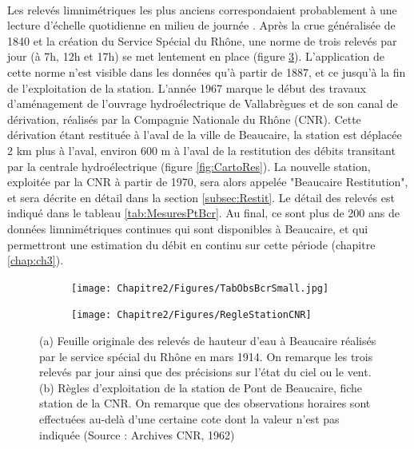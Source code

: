 	\paragraph{} Les relevés limnimétriques les plus anciens correspondaient probablement à une lecture d'échelle quotidienne en milieu de journée \citep{pichard_hauteurs_2013}. Après la crue généralisée de 1840 et la création du Service Spécial du Rhône, une norme de trois relevés par jour (à 7h, 12h et 17h) se met lentement en place (figure \ref{fig:RelevesPt}). L'application de cette norme n'est visible dans les données qu'à partir de 1887, et ce jusqu'à la fin de l'exploitation de la station.  L'année 1967 marque le début des travaux d'aménagement de l'ouvrage hydroélectrique de Vallabrègues et de son canal de dérivation, réalisés par la Compagnie Nationale du Rhône (CNR). Cette dérivation étant restituée à l'aval de la ville de Beaucaire, la station est déplacée 2 km plus à l'aval, environ 600 m à l'aval de la restitution des débits transitant par la centrale hydroélectrique (figure \ref{fig:CartoRes}). La nouvelle station, exploitée par la CNR à partir de 1970, sera alors appelée "Beaucaire Restitution", et sera décrite en détail dans la section \ref{subsec:Restit}. Le détail des relevés est indiqué dans le tableau \ref{tab:MesuresPtBcr}. Au final, ce sont plus de 200 ans de données limnimétriques continues qui sont disponibles à Beaucaire, et qui permettront une estimation du débit en continu sur cette période (chapitre \ref{chap:ch3}). 
	
	\begin{figure}[h]
          \centering
            \begin{subfigure}{0.49\linewidth}
            \centering
            	\texttt{[image: Chapitre2/Figures/TabObsBcrSmall.jpg]}\hfill
            	\caption{}
            	\label{subfig:TabObsPt}
            \end{subfigure}
            \begin{subfigure}{0.49\linewidth}
            \centering
            	\texttt{[image: Chapitre2/Figures/RegleStationCNR]}
            	\caption{}
           		\label{subfig:RegleCNR}
            \end{subfigure}
      \caption{(a) Feuille originale des relevés de hauteur d'eau à Beaucaire réalisés par le service spécial du Rhône en mars 1914. On remarque les trois relevés par jour ainsi que des précisions sur l'état du ciel ou le vent. (b) Règles d'exploitation de la station de Pont de Beaucaire, fiche station de la CNR. On remarque que des observations horaires sont effectuées au-delà d'une certaine cote dont la valeur n'est pas indiquée (Source : Archives CNR, 1962)}
	 \label{fig:RelevesPt}
	\end{figure}            
            
